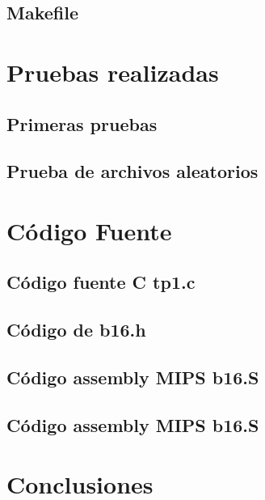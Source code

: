 \documentclass{article}
\begin{document}
\subsection{Makefile}


\section{Pruebas realizadas}
\subsection{Primeras pruebas}

\subsection{Prueba de archivos aleatorios}


\section{C\'odigo Fuente}
\subsection{C\'odigo fuente C tp1.c}

\subsection{C\'odigo de b16.h}

\subsection{C\'odigo assembly MIPS b16.S}

\subsection{C\'odigo assembly MIPS b16.S}


\section{Conclusiones}
\end{document}
